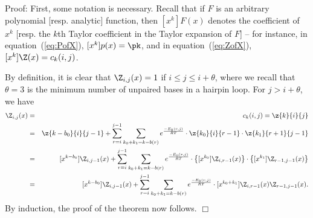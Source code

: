 \noindent
{\sc Proof:}
First, some notation is necessary. Recall that if $F$ is an arbitrary
polynomial [resp. analytic] function, then $[x^k] F(x)$
denotes the coefficient of $x^k$ [resp. the $k$th Taylor coefficient in the
Taylor expansion of $F$] -- for instance, in equation~(\ref{eq:PofX}),
$[x^k]p(x) = \pk$, and in equation~(\ref{eq:ZofX}), $[x^k]\Z(x) = c_k(i,j)$.

By definition, it is clear that $\Z_{i,j}(x)=1$ if $i\leq j \leq i+\theta$,
where we recall that $\theta = 3$ is the minimum number of unpaired bases in
a hairpin loop.  For $j>i+\theta$, we have
\begin{eqnarray*}
[x^k] \Z_{i,j}(x) &=& c_k(i,j) = \z{k}{i}{j}\\
&=&\z{k-b_0}{i}{j-1} + \sum_{r=i}^{j-1} \sum_{k_0+k_1 = k-b(r)}
e^{\frac{-E_0(r,j)}{RT}} \cdot \z{k_0}{i}{r-1} \cdot \z{k_1}{r+1}{j-1} \\
&=&
[x^{k-b_0}] \Z_{i,j-1}(x) +
\sum_{r=i}^{j-1} \sum_{k_0+k_1 = k-b(r)}
e^{\frac{-E_0(r,j)}{RT}} \cdot \left\{ [x^{k_0}] \Z_{i,r-1}(x) \right\} \cdot
\left\{ [x^{k_1}] \Z_{r-1,j-1}(x) \right\} \\
&=&
[x^{k-b_0}] \Z_{i,j-1}(x) +
\sum_{r=i}^{j-1} \sum_{k_0+k_1 = k-b(r)}
e^{\frac{-E_0(r,j)}{RT}} \cdot [x^{k_0+k_1}] \Z_{i,r-1}(x) \Z_{r-1,j-1}(x) .\\
\end{eqnarray*}
By induction, the proof of the theorem now follows. $\Box$
\medskip

